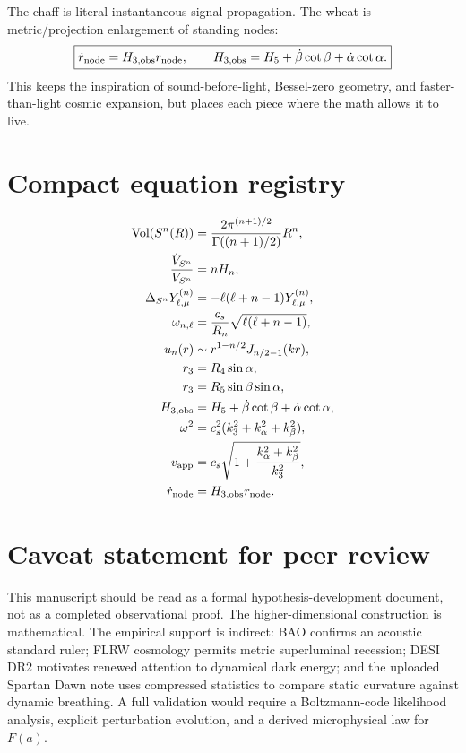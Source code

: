 \documentclass[11pt]{article}
\newcommand{\Vol}{\operatorname{Vol}}
\begin{document}
The chaff is literal instantaneous signal propagation.  The wheat is metric/projection enlargement of standing nodes:
\begin{equation}
\boxed{
\dot r_{\rm node}=H_{3,\rm obs}r_{\rm node},
\qquad
H_{3,\rm obs}=H_5+\dot\beta\cot\beta+\dot\alpha\cot\alpha.
}
\end{equation}
This keeps the inspiration of sound-before-light, Bessel-zero geometry, and faster-than-light cosmic expansion, but places each piece where the math allows it to live.

\appendix

\section{Compact equation registry}

\begin{align}
 \Vol(S^n(R))&=\frac{2\pi^{(n+1)/2}}{\Gamma((n+1)/2)}R^n,\\
 \frac{\dot V_{S^n}}{V_{S^n}}&=nH_n,\\
 \Delta_{S^n}Y_{\ell,\mu}^{(n)}&=-\ell(\ell+n-1)Y_{\ell,\mu}^{(n)},\\
 \omega_{n,\ell}&=\frac{c_s}{R_n}\sqrt{\ell(\ell+n-1)},\\
 u_n(r)&\sim r^{1-n/2}J_{n/2-1}(kr),\\
 r_3&=R_4\sin\alpha,\\
 r_3&=R_5\sin\beta\sin\alpha,\\
 H_{3,\mathrm{obs}}&=H_5+\dot\beta\cot\beta+\dot\alpha\cot\alpha,\\
 \omega^2&=c_s^2(k_3^2+k_\alpha^2+k_\beta^2),\\
 v_{\rm app}&=c_s\sqrt{1+\frac{k_\alpha^2+k_\beta^2}{k_3^2}},\\
 \dot r_{\rm node}&=H_{3,\mathrm{obs}}r_{\rm node}.
\end{align}

\section{Caveat statement for peer review}

This manuscript should be read as a formal hypothesis-development document, not as a completed observational proof.  The higher-dimensional construction is mathematical.  The empirical support is indirect: BAO confirms an acoustic standard ruler; FLRW cosmology permits metric superluminal recession; DESI DR2 motivates renewed attention to dynamical dark energy; and the uploaded Spartan Dawn note uses compressed statistics to compare static curvature against dynamic breathing.  A full validation would require a Boltzmann-code likelihood analysis, explicit perturbation evolution, and a derived microphysical law for $F(a)$.
\end{document}
